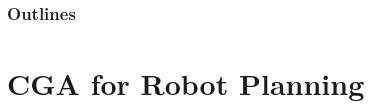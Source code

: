 \begin{frame}[plain] %
  \titlepage
\end{frame}
\begin{frame}
  \frametitle{Outlines}
  \tableofcontents[]
\end{frame}
\section{CGA for Robot Planning}
\tableofcontents[currentsection]
